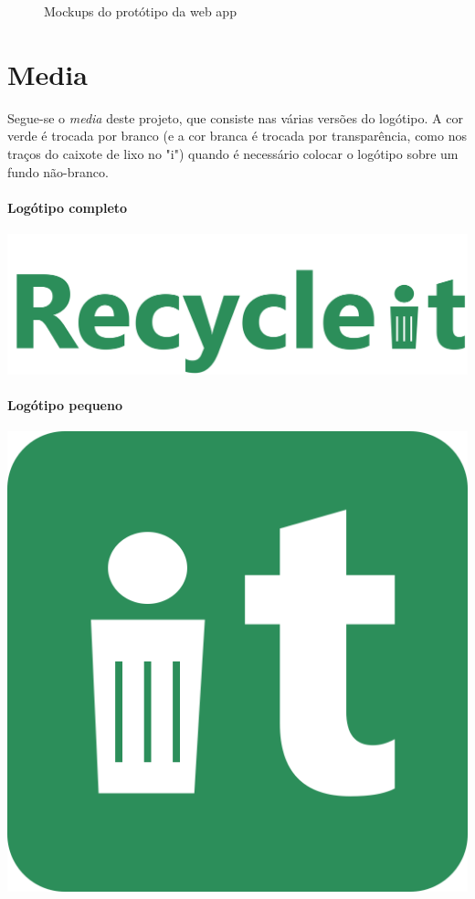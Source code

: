 \documentclass[11pt, a4paper, oneside]{book}
\begin{document}
\begin{appendices}
\begin{figure}[h!]
    \caption{Mockups do protótipo da web app}
\end{figure}

\chapter{Media}

Segue-se o \textit{media} deste projeto, que consiste nas várias versões do logótipo. A cor verde é trocada por branco (e a cor branca é trocada por transparência, como nos traços do caixote de lixo no "i") quando é necessário colocar o logótipo sobre um fundo não-branco.

\subsubsection{Logótipo completo}

\begin{center}
    \includegraphics[scale=2.0]{img/recycle-it-full.png}
\end{center}

\subsubsection{Logótipo pequeno}

\begin{center}
    \includegraphics[scale=2.0]{img/recycle-it.png}
\end{center}

\end{appendices}
\end{document}
